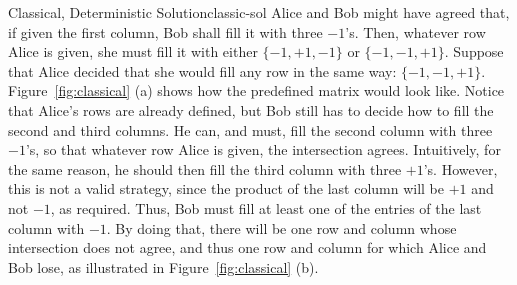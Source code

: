 \documentclass{llncs}
\begin{document}
\begin{tcbexample}{Classical, Deterministic Solution}{classic-sol}
  Alice and Bob might have agreed that, if given the first column, Bob shall fill it
  with three \(-1\)'s. Then, whatever row Alice is given, she must fill
  it with either \(\{-1, +1, -1\}\) or \(\{-1, -1, +1\}\). Suppose that
  Alice decided that she would fill any row in the same way:
  \(\{-1, -1, +1\}\). Figure~\ref{fig:classical} (a) shows how the
  predefined matrix would look like. Notice that Alice's rows are
  already defined, but Bob still has to decide how to fill the second
  and third columns. He can, and must, fill the second column with three
  \(-1\)'s, so that whatever row Alice is given, the intersection
  agrees. Intuitively, for the same reason, he should then fill the
  third column with three \(+1\)'s. However, this is not a valid
  strategy, since the product of the last column will be \(+1\) and not
  \(-1\), as required. Thus, Bob must fill at least one of the
  entries of the last column with \(-1\).  By doing that, there will be
  one row and column whose intersection does not agree, and thus one row
  and column for which Alice and Bob lose, as illustrated in
  Figure~\ref{fig:classical} (b).


\end{tcbexample}
\end{document}
